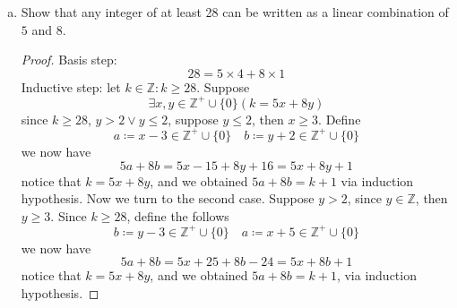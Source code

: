 \documentclass[12pt]{article}
\newcommand{\Z}{\mathbb{Z}}
\newcommand{\paren}[1]{\left( #1 \right)}
\newcommand{\zero}{\{0\}}
\begin{document}
\begin{enumerate}
\begin{enumerate}
\begin{enumerate}[a.]
                    \item Show that any integer of at least 28 can be written as a linear combination of $5$ and $8$.
                        \begin{proof}
                            Basis step:
                            \[
                            28 = 5\times 4 + 8 \times 1
                            \]
                            Inductive step: let $k \in \Z : k \geq 28$. Suppose 
                            \[
                            \exists x,y \in \Z^+ \cup \zero
                            \paren{k = 5x+8y}
                            \]
                            since $k \geq 28$, $y > 2 \vee y \leq 2$, suppose $y \leq 2$, then $x\geq 3$. Define 
                            \[
                            a \coloneqq x-3 \in \Z^+ \cup \zero \quad b\coloneqq y +2 \in \Z^+ \cup \zero
                            \]
                            we now have 
                            \[
                            5a + 8b = 5x-15 + 8y+16 = 5x+8y +1
                            \]
                            notice that $k = 5x+8y$, and we obtained $5a+8b = k+1$ via induction hypothesis. Now we turn to the second case. Suppose $y > 2$, since $y \in \Z$, then $y \geq 3$. Since $k \geq 28$, define the follows
                            \[
                            b \coloneqq y-3 \in \Z^+ \cup \zero \quad a \coloneqq x+5 \in \Z^+ \cup \zero
                            \]
                            we now have
                            \[
                            5a+8b = 5x+25+8b-24 = 5x+8b +1
                            \]
                            notice that $k = 5x+8y$, and we obtained $5a+8b = k+1$, via induction hypothesis.

                        \end{proof}


\end{enumerate}
\end{enumerate}
\end{enumerate}
\end{document}
